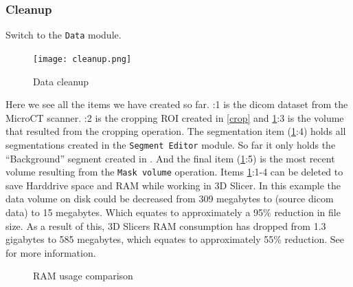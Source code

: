 \subsubsection{Cleanup}
Switch to the \texttt{Data} module.
\begin{figure}[h!]
	\centerline{
		\texttt{[image: cleanup.png]}}
	  \caption{Data cleanup}
	  \label{fig:clr}
	\end{figure}
\noindent
Here we see all the items we have created so far.
:1 is the dicom dataset from the MicroCT scanner.
:2 is the cropping ROI created in \cref{crop} and \cref{fig:clr}:3 is the volume that resulted from the cropping operation.
The segmentation item (\cref{fig:clr}:4) holds all segmentations created in the \texttt{Segment Editor} module. So far it only holds the ``Background'' segment created in . And the final item (\cref{fig:clr}:5) is the most recent volume resulting from the \texttt{Mask volume} operation.
Items \cref{fig:clr}:1-4 can be deleted to save Harddrive space and RAM while working in 3D Slicer.
\noindent
In this example the data volume on disk could be decreased from 309 megabytes to (source dicom data) to 15 megabytes.
Which equates to approximately a 95\% reduction in file size.
As a result of this, 3D Slicers RAM consumption has dropped from 1.3 gigabytes to 585 megabytes, which equates to approximately 55\% reduction.
See  for more information.
\begin{figure}
\caption{RAM usage comparison}\label{fig:ramUC}
\end{figure}
\pagebreak


